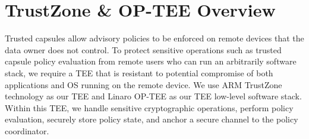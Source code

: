 



\chapter{TrustZone \& OP-TEE Overview}
\label{ch:trustzone}

Trusted capsules allow advisory policies to be enforced on remote devices that the data owner does not
control. To protect sensitive operations such as trusted capsule policy evaluation
from remote users who can run an arbitrarily software stack, we require a \ac{TEE} 
that is resistant to potential compromise of both applications and \acs{OS} 
running on the remote device. 
We use
ARM TrustZone technology as our \ac{TEE}
and Linaro OP-TEE as our \ac{TEE} low-level software stack.
Within this \ac{TEE}, we handle sensitive cryptographic operations, perform policy evaluation, 
securely store policy state, and anchor a secure channel to the policy coordinator. 

